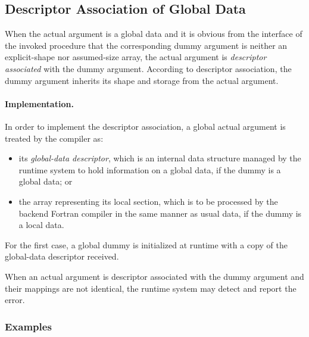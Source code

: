 \subsection{Descriptor Association of Global Data}

When the actual argument is a global data and it is obvious from the
interface of the invoked procedure that the corresponding dummy argument
is neither an explicit-shape nor assumed-size array, the actual
argument is {\it descriptor associated} with the dummy
argument. According to descriptor association, the dummy argument 
inherits its shape and storage from the actual argument.

\paragraph{Implementation.}

In order to implement the descriptor association, a global actual
argument is treated by the {\XMP} compiler as:

\begin{itemize}
 \item its {\it global-data descriptor}, which is an internal data
       structure managed by the {\XMP} runtime system to hold
       information on a global data, if the dummy is a global data; or
 \item the array representing its local section, which is to be processed
       by the backend Fortran compiler in the same manner as usual data,
       if the dummy is a local data.
\end{itemize}

For the first case, a global dummy is initialized at runtime with a copy
of the global-data descriptor received.

When an actual argument is descriptor associated with the dummy
argument and their mappings are not identical, the {\XMP} runtime system
may detect and report the error.

\subsubsection*{Examples}

